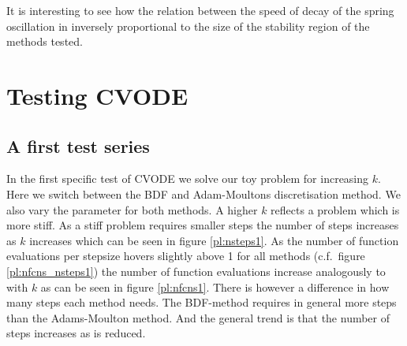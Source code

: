 \documentclass{scrartcl}
\begin{document}
It is interesting to see how the relation between the speed of decay of the spring oscillation in inversely proportional to the size of the stability region of the methods tested.


\section*{Testing CVODE}
\subsection*{A first test series}

In the first specific test of CVODE we solve our toy problem for increasing $k$. Here we switch between the BDF and Adam-Moultons discretisation method. We also vary the  parameter for both methods.
A higher $k$ reflects a problem which is more stiff. As a stiff problem requires smaller steps the number of steps  increases as $k$ increases which  can be seen in figure \ref{pl:nsteps1}. As the number of function evaluations per stepsize  hovers slightly above 1 for all methods (c.f.\ figure \ref{pl:nfcns_nsteps1}) the number of function evaluations increase analogously to  with $k$ as can be seen in figure \ref{pl:nfcns1}. There is however a difference in how many steps each method needs. The BDF-method requires in general more steps than the Adams-Moulton method. And the general trend is that the number of steps increases as  is reduced. 
\end{document}
